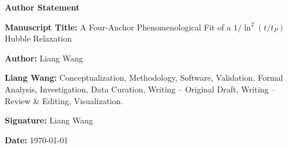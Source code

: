 \documentclass[11pt]{article}
\begin{document}
\begin{center}
\Large\textbf{Author Statement}
\end{center}

\vspace{1cm}

\noindent\textbf{Manuscript Title:} A Four-Anchor Phenomenological Fit of a $1/\ln^2(t/t_P)$ Hubble Relaxation

\vspace{0.5cm}

\noindent\textbf{Author:} Liang Wang

\vspace{1cm}

\noindent\textbf{Liang Wang:} Conceptualization, Methodology, Software, Validation, Formal Analysis, Investigation, Data Curation, Writing -- Original Draft, Writing -- Review \& Editing, Visualization.

\vspace{2cm}

\noindent\textbf{Signature:} Liang Wang

\noindent\textbf{Date:} \today
\end{document}
